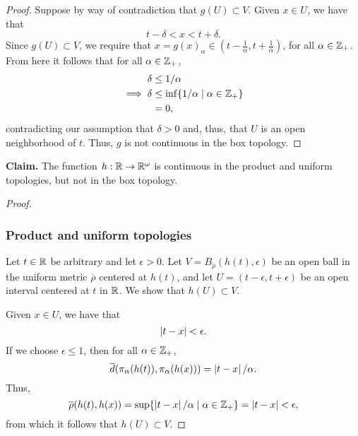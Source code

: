 \begin{solution}
\begin{proof}
        Suppose by way of contradiction that $g(U) \subset V$.
        Given $x \in U$, we have that
        \begin{equation*}
            t - \delta < x < t + \delta.
        \end{equation*}
        Since $g(U) \subset V$, we require that $x = g(x)_\alpha \in (t - \tfrac{1}{\alpha}, t + \tfrac{1}{\alpha})$, for all $\alpha \in \mathbb{Z}_+$.
        From here it follows that for all $\alpha \in \mathbb{Z}_+$,
        \begin{align*}
            \delta          &\leq 1 / \alpha \\
            \implies \delta &\leq \inf\{1 / \alpha \mid \alpha \in \mathbb{Z}_+\} \\
                            &= 0,
        \end{align*}
        contradicting our assumption that $\delta > 0$ and, thus, that $U$ is an open neighborhood of $t$.
        Thus, $g$ is not continuous in the box topology.
    \end{proof}
    \bigskip

    \noindent\textbf{Claim.} The function $h: \mathbb{R} \rightarrow \mathbb{R}^\omega$ is continuous in the product and uniform topologies, but not in the box topology.
    \begin{proof}~

        \subsubsection*{Product and uniform topologies}
        Let $t \in \mathbb{R}$ be arbitrary and let $\epsilon > 0$.
        Let $V = B_{\overline{\rho}}(h(t), \epsilon)$ be an open ball in the uniform metric $\overline{\rho}$ centered at $h(t)$, and let $U = (t - \epsilon, t + \epsilon)$ be an open interval centered at $t$ in $\mathbb{R}$.
        We show that $h(U) \subset V$.

        Given $x \in U$, we have that
        \begin{equation*}
          \left| t - x \right| < \epsilon.
        \end{equation*}
        If we choose $\epsilon \leq 1$, then for all $\alpha \in \mathbb{Z}_+$,
        \begin{equation*}
        \overline{d}(\pi_\alpha(h(t)), \pi_\alpha(h(x))) = \left| t - x \right| / \alpha.
        \end{equation*}
        Thus,
        \begin{equation*}
          \overline{\rho}(h(t), h(x)) = \sup\{\left| t - x \right| / \alpha \mid \alpha \in \mathbb{Z}_+\} = \left| t - x \right| < \epsilon,
        \end{equation*}
        from which it follows that $h(U) \subset V$.


\end{proof}
\end{solution}
